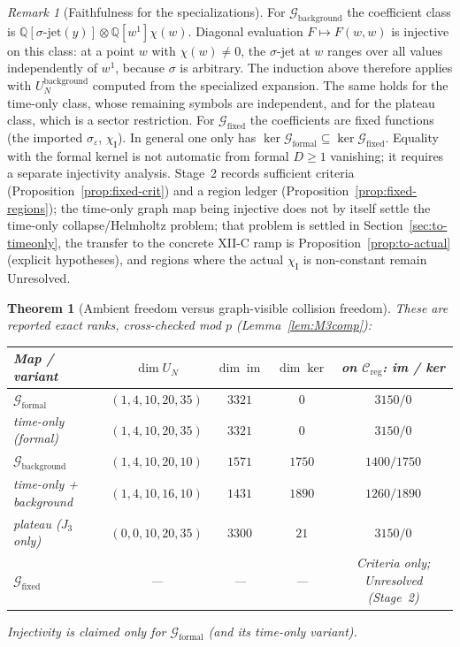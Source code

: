 \documentclass{article}
\newtheorem{theorem}[proposition]{Theorem}
\theoremstyle{remark}
\newtheorem{remark}[proposition]{Remark}
\newcommand{\sigeps}{\sigma_\varepsilon}
\newcommand{\chiI}{\chi_{\mathrm I}}
\newcommand{\Creg}{\mathcal C_{\mathrm{reg}}}
\begin{document}
\begin{remark}[Faithfulness for the specializations]
For $\mathcal G_{\mathrm{background}}$ the coefficient class is $\mathbb Q[\sigma\text{-jet}(y)]\otimes\mathbb Q[w^1]\chi(w)$.
Diagonal evaluation $F\mapsto F(w,w)$ is injective on this class: at a point $w$ with $\chi(w)\ne0$, the $\sigma$-jet at $w$ ranges over all values independently of $w^1$, because $\sigma$ is arbitrary.
The induction above therefore applies with $U_N^{\mathrm{background}}$ computed from the specialized expansion.
The same holds for the time-only class, whose remaining symbols are independent, and for the plateau class, which is a sector restriction.
For $\mathcal G_{\mathrm{fixed}}$ the coefficients are fixed functions (the imported $\sigeps$, $\chiI$).
In general one only has $\ker\mathcal G_{\mathrm{formal}}\subseteq\ker\mathcal G_{\mathrm{fixed}}$.
Equality with the formal kernel is not automatic from formal $D\ge1$ vanishing; it requires a separate injectivity analysis.
Stage~2 records sufficient criteria (Proposition~\ref{prop:fixed-crit}) and a region ledger (Proposition~\ref{prop:fixed-regions}); the time-only graph map being injective does not by itself settle the time-only collapse/Helmholtz problem; that problem is settled in Section~\ref{sec:to-timeonly}, the transfer to the concrete XII-C ramp is Proposition~\ref{prop:to-actual} (explicit hypotheses), and regions where the actual $\chiI$ is non-constant remain Unresolved.
\end{remark}

\begin{theorem}[Ambient freedom versus graph-visible collision freedom]
\label{thm:M3}
These are reported exact ranks, cross-checked mod $p$ (Lemma~\ref{lem:M3comp}):
\begin{center}
\begin{tabular}{lcccc}
\hline
Map / variant & $\dim U_N$ & $\dim\operatorname{im}$ & $\dim\ker$ & on $\Creg$: im / ker\\
\hline
$\mathcal G_{\mathrm{formal}}$ & $(1,4,10,20,35)$ & $3321$ & $0$ & $3150/0$\\
time-only (formal) & $(1,4,10,20,35)$ & $3321$ & $0$ & $3150/0$\\
$\mathcal G_{\mathrm{background}}$ & $(1,4,10,20,10)$ & $1571$ & $1750$ & $1400/1750$\\
time-only + background & $(1,4,10,16,10)$ & $1431$ & $1890$ & $1260/1890$\\
plateau ($J_3$ only) & $(0,0,10,20,35)$ & $3300$ & $21$ & $3150/0$\\
$\mathcal G_{\mathrm{fixed}}$ & --- & --- & --- & Criteria only; Unresolved (Stage~2)\\
\hline
\end{tabular}
\end{center}
Injectivity is claimed only for $\mathcal G_{\mathrm{formal}}$ (and its time-only variant).
\end{theorem}
\end{document}
